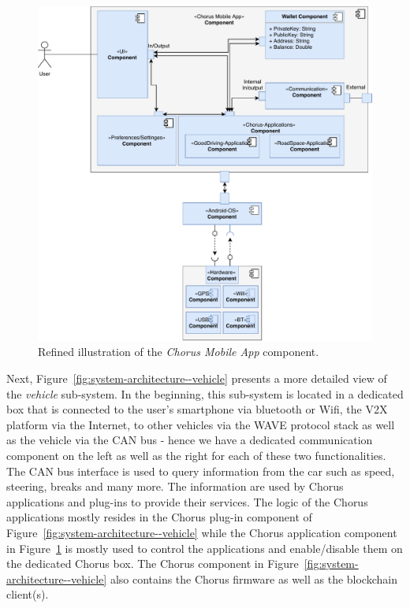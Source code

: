 \documentclass{llncs}
\begin{document}
{				\begin{figure}
					\centering
					\includegraphics[scale=0.65]{Figures/longterm-architecture/20180507_Refined-sys-architecture--mobile-app.pdf}
					\caption{Refined illustration of the \textit{Chorus Mobile App} component.}	
					\label{fig:system-architecture--app}
				\end{figure}
				Next, Figure~\ref{fig:system-architecture--vehicle} presents a more detailed view of the \textit{vehicle} sub-system. In the beginning, this sub-system is located in a dedicated box that is connected to the user's smartphone via bluetooth or Wifi, the V2X platform via the Internet, to other vehicles via the WAVE protocol stack \cite{li2010overview}\cite{uzcategui2009wave} as  well as the vehicle via the CAN bus - hence we have a dedicated communication component on the left as well as the right for each of these two functionalities. The CAN bus interface is used to query information from the car such as speed, steering, breaks and many more. The information are used by Chorus applications and plug-ins to provide their services. The logic of the Chorus applications mostly resides in the Chorus plug-in component of Figure~\ref{fig:system-architecture--vehicle} while the Chorus application component in Figure~\ref{fig:system-architecture--app} is mostly used to control the applications and enable/disable them on the dedicated Chorus box. The Chorus component in Figure~\ref{fig:system-architecture--vehicle} also contains the Chorus firmware as well as the blockchain client(s). 
			
}
\end{document}
